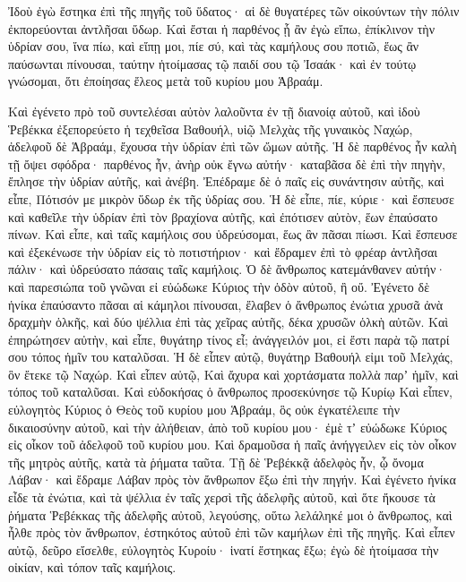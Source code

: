 {Ἰδοὺ ἐγὼ ἕστηκα ἐπὶ τῆς πηγῆς τοῦ ὕδατος· αἱ δὲ θυγατέρες τῶν οἰκούντων τὴν πόλιν ἐκπορεύονται ἀντλῆσαι ὕδωρ.
Καὶ ἔσται ἡ παρθένος ᾗ ἂν ἐγὼ εἴπω, ἐπίκλινον τὴν ὑδρίαν σου, ἵνα πίω, καὶ εἴπῃ μοι, πίε σύ, καὶ τὰς καμήλους σου ποτιῶ, ἕως ἂν παύσωνται πίνουσαι, ταύτην ἡτοίμασας τῷ παιδί σου τῷ Ἰσαάκ· καὶ ἐν τούτῳ γνώσομαι, ὅτι ἐποίησας ἔλεος μετὰ τοῦ κυρίου μου Ἁβραάμ.
\par }{\PP {}Καὶ ἐγένετο πρὸ τοῦ συντελέσαι αὐτὸν λαλοῦντα ἐν τῇ διανοίᾳ αὐτοῦ, καὶ ἰδοὺ Ῥεβέκκα ἐξεπορεύετο ἡ τεχθεῖσα Βαθουήλ, υἱῷ Μελχὰς τῆς γυναικὸς Ναχώρ, ἀδελφοῦ δὲ Ἁβραάμ, ἔχουσα τὴν ὑδρίαν ἐπὶ τῶν ὤμων αὐτῆς.
Ἡ δὲ παρθένος ἦν καλὴ τῇ ὄψει σφόδρα· παρθένος ἦν, ἀνὴρ οὐκ ἔγνω αὐτήν· καταβᾶσα δὲ ἐπὶ τὴν πηγὴν, ἔπλησε τὴν ὑδρίαν αὐτῆς, καὶ ἀνέβη.
Ἐπέδραμε δὲ ὁ παῖς εἰς συνάντησιν αὐτῆς, καὶ εἶπε, Πότισόν με μικρὸν ὕδωρ ἐκ τῆς ὑδρίας σου.
Ἡ δὲ εἶπε, πίε, κύριε· καὶ ἔσπευσε καὶ καθεῖλε τὴν ὑδρίαν ἐπὶ τὸν βραχίονα αὐτῆς, καὶ ἐπότισεν αὐτὸν, ἕων ἐπαύσατο πίνων.
Καὶ εἶπε, καὶ ταῖς καμήλοις σου ὑδρεύσομαι, ἕως ἂν πᾶσαι πίωσι.
Καὶ ἔσπευσε καὶ ἐξεκένωσε τὴν ὑδρίαν εἰς τὸ ποτιστήριον· καὶ ἔδραμεν ἐπὶ τὸ φρέαρ ἀντλῆσαι πάλιν· καὶ ὑδρεύσατο πάσαις ταῖς καμήλοις.
Ὁ δὲ ἄνθρωπος κατεμάνθανεν αὐτήν· καὶ παρεσιώπα τοῦ γνῶναι εἰ εὐώδωκε Κύριος τὴν ὁδὸν αὐτοῦ, ἢ οὔ.
Ἐγένετο δὲ ἡνίκα ἐπαύσαντο πᾶσαι αἱ κάμηλοι πίνουσαι, ἔλαβεν ὁ ἄνθρωπος ἐνώτια χρυσᾶ ἀνὰ δραχμὴν ὁλκῆς, καὶ δύο ψέλλια ἐπὶ τὰς χεῖρας αὐτῆς, δέκα χρυσῶν ὁλκὴ αὐτῶν.
Καὶ ἐπηρώτησεν αὐτὴν, καὶ εἶπε, θυγάτηρ τίνος εἶ; ἀνάγγειλόν μοι, εἰ ἔστι παρὰ τῷ πατρί σου τόπος ἡμῖν του καταλῦσαι.
Ἡ δὲ εἶπεν αὐτῷ, θυγάτηρ Βαθουήλ εἰμι τοῦ Μελχάς, ὃν ἔτεκε τῷ Ναχώρ.
Καὶ εἶπεν αὐτῷ, Καὶ ἄχυρα καὶ χορτάσματα πολλὰ παρʼ ἡμῖν, καὶ τόπος τοῦ καταλῦσαι.
Καὶ εὐδοκήσας ὁ ἄνθρωπος προσεκύνησε τῷ Κυρίῳ
Καὶ εἶπεν, εὐλογητὸς Κύριος ὁ Θεὸς τοῦ κυρίου μου Ἁβραάμ, ὃς οὐκ ἐγκατέλειπε τὴν δικαιοσύνην αὐτοῦ, καὶ τὴν ἀλήθειαν, ἀπὸ τοῦ κυρίου μου· ἐμὲ τʼ εὐώδωκε Κύριος εἰς οἶκον τοῦ ἀδελφοῦ τοῦ κυρίου μου.
Καὶ δραμοῦσα ἡ παῖς ἀνήγγειλεν εἰς τὸν οἶκον τῆς μητρὸς αὐτῆς, κατὰ τὰ ῥήματα ταῦτα.
Τῇ δὲ Ῥεβέκκᾷ ἀδελφὸς ἦν, ᾧ ὄνομα Λάβαν· καὶ ἔδραμε Λάβαν πρὸς τὸν ἄνθρωπον ἔξω ἐπὶ τὴν πηγήν.
Καὶ ἐγένετο ἡνίκα εἶδε τὰ ἐνώτια, καὶ τὰ ψέλλια ἐν ταῖς χερσὶ τῆς ἀδελφῆς αὐτοῦ, καὶ ὅτε ἤκουσε τὰ ῥήματα Ῥεβέκκας τῆς ἀδελφῆς αὐτοῦ, λεγούσης, οὕτω λελάληκέ μοι ὁ ἄνθρωπος, καὶ ἦλθε πρὸς τὸν ἄνθρωπον, ἑστηκότος αὐτοῦ ἐπὶ τῶν καμήλων ἐπὶ τῆς πηγῆς.
Καὶ εἶπεν αὐτῷ, δεῦρο εἴσελθε, εὐλογητὸς Κυροίυ· ἱνατί ἕστηκας ἔξω; ἐγὼ δὲ ἡτοίμασα τὴν οἰκίαν, καὶ τόπον ταῖς καμήλοις.
}
